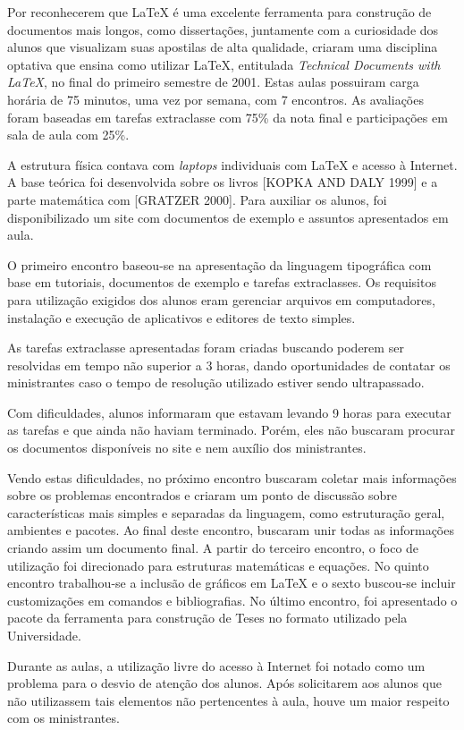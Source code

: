 \documentclass{article}
\begin{document}
Por reconhecerem que \LaTeX{} é uma excelente ferramenta para construção de
documentos mais longos, como dissertações, juntamente com a curiosidade dos
alunos que visualizam suas apostilas de alta qualidade, criaram uma disciplina
optativa que ensina como utilizar \LaTeX{}, entitulada \textit{Technical
Documents with \LaTeX{}}, no final do primeiro semestre de 2001. Estas aulas
possuiram carga horária de 75 minutos, uma vez por semana, com 7 encontros. As
avaliações foram baseadas em tarefas extraclasse com 75\% da nota final e
participações em sala de aula com 25\%.

A estrutura física contava com \textit{laptops} individuais com \LaTeX{} e
acesso à Internet. A base teórica foi desenvolvida sobre os livros [KOPKA AND
DALY 1999] e a parte matemática com [GRATZER 2000]. Para auxiliar os alunos, foi
disponibilizado um site com documentos de exemplo e assuntos apresentados em
aula.

O primeiro encontro baseou-se na apresentação da linguagem tipográfica com base
em tutoriais, documentos de exemplo e tarefas extraclasses. Os requisitos para
utilização exigidos dos alunos eram gerenciar arquivos em computadores,
instalação e execução de aplicativos e editores de texto simples.

As tarefas extraclasse apresentadas foram criadas buscando poderem ser
resolvidas em tempo não superior a 3 horas, dando oportunidades de contatar os
ministrantes caso o tempo de resolução utilizado estiver sendo ultrapassado.

Com dificuldades, alunos informaram que estavam levando 9 horas para executar as
tarefas e que ainda não haviam terminado. Porém, eles não buscaram procurar os
documentos disponíveis no site e nem auxílio dos ministrantes.

Vendo estas dificuldades, no próximo encontro buscaram coletar mais informações
sobre os problemas encontrados e criaram um ponto de discussão sobre
características mais simples e separadas da linguagem, como estruturação geral,
ambientes e pacotes. Ao final deste encontro, buscaram unir todas as informações
criando assim um documento final. A partir do terceiro encontro, o foco de
utilização foi direcionado para estruturas matemáticas e equações. No quinto
encontro trabalhou-se a inclusão de gráficos em \LaTeX{} e o sexto buscou-se
incluir customizações em comandos e bibliografias. No último encontro, foi
apresentado o pacote da ferramenta para construção de Teses no formato utilizado
pela Universidade.

Durante as aulas, a utilização livre do acesso à Internet foi notado como um
problema para o desvio de atenção dos alunos. Após solicitarem aos alunos que
não utilizassem tais elementos não pertencentes à aula, houve um maior respeito
com os ministrantes.
\end{document}
